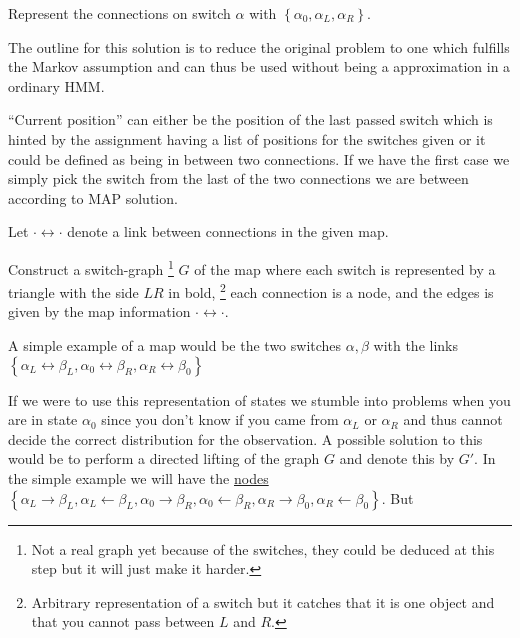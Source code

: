 \documentclass[a4paper,twoside=false,abstract=false,numbers=noenddot,
titlepage=false,headings=small,parskip=half,version=last]{scrartcl}
\begin{document}
\begin{solution}
    Represent the connections on switch $\alpha$ with 
    $\left\{\alpha_0,\alpha_L,\alpha_R\right\}$. 

    The outline for this solution is to reduce the original problem to one
    which fulfills the Markov assumption and can thus be used without being a
    approximation in a ordinary HMM.

    ``Current position'' can either be the position of the last passed switch
    which is hinted by the assignment having a list of positions for the
    switches given or it could be defined as being in between two connections.
    If we have the first case we simply pick the switch from the last of the
    two connections we are between according to MAP solution. 

    Let $\cdot\leftrightarrow\cdot$ denote a link between connections in the
    given map.

    Construct a switch-graph
    \footnote{Not a real graph yet because of the
    switches, they could be deduced at this step but it will just make it
    harder.}
    $G$ of the map where each switch is represented by a triangle with the
    side $LR$ in bold,
    \footnote{Arbitrary representation of a switch but it catches that it is
    one object and that you cannot pass between $L$ and $R$.} 
    each connection is a node, and the edges is given by the map information
    $\cdot\leftrightarrow\cdot$. 

    A simple example of a map would be the two switches $\alpha,\beta$ with the
    links 
    $\left\{
        \alpha_L\leftrightarrow\beta_L,
        \alpha_0\leftrightarrow\beta_R,
        \alpha_R\leftrightarrow\beta_0
    \right\}$

    If we were to use this representation of states we stumble into
    problems when you are in state $\alpha_0$ since you don't know if you came
    from $\alpha_L$ or $\alpha_R$ and thus cannot decide the correct 
    distribution for the observation. A possible solution to this would be to
    perform a directed lifting of the graph $G$ and denote this by $G'$.
    In the simple example we will have the \underline{nodes}
    $\left\{
        \alpha_L\rightarrow\beta_L,
        \alpha_L\leftarrow\beta_L,
        \alpha_0\rightarrow\beta_R,
        \alpha_0\leftarrow\beta_R,
        \alpha_R\rightarrow\beta_0,
        \alpha_R\leftarrow\beta_0
    \right\}$.
    But 



\end{solution}
\end{document}
